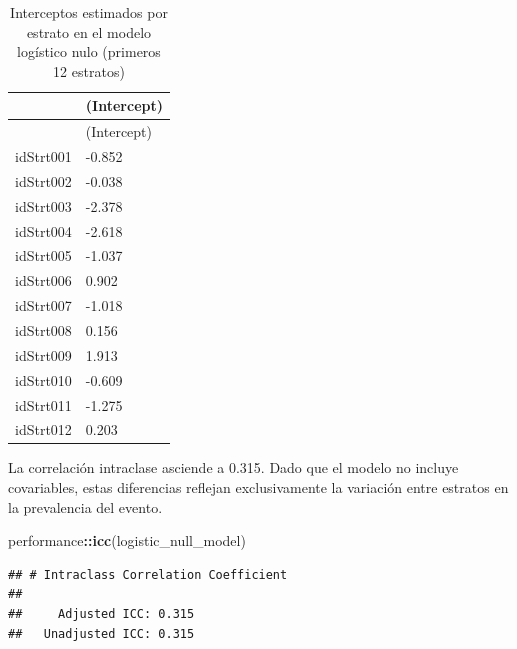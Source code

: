 \documentclass[
  spanish,
  12pt,
]{book}
\newenvironment{Shaded}{\begin{snugshade}}{\end{snugshade}}
\newcommand{\DataTypeTok}[1]{\textcolor[rgb]{0.13,0.29,0.53}{#1}}
\newcommand{\DecValTok}[1]{\textcolor[rgb]{0.00,0.00,0.81}{#1}}
\newcommand{\FunctionTok}[1]{\textcolor[rgb]{0.13,0.29,0.53}{\textbf{#1}}}
\newcommand{\NormalTok}[1]{#1}
\newcommand{\SpecialCharTok}[1]{\textcolor[rgb]{0.81,0.36,0.00}{\textbf{#1}}}
\begin{document}
\begin{Shaded}
\end{Shaded}

\begin{longtable}[]{@{}ll@{}}
\caption{\label{tab:tab-coef-logit-nulo}Interceptos estimados por estrato en el modelo logístico nulo (primeros 12 estratos)}\tabularnewline
\toprule\noalign{}
& (Intercept) \\
\midrule\noalign{}
\endfirsthead
\toprule\noalign{}
& (Intercept) \\
\midrule\noalign{}
\endhead
\bottomrule\noalign{}
\endlastfoot
idStrt001 & -0.852 \\
idStrt002 & -0.038 \\
idStrt003 & -2.378 \\
idStrt004 & -2.618 \\
idStrt005 & -1.037 \\
idStrt006 & 0.902 \\
idStrt007 & -1.018 \\
idStrt008 & 0.156 \\
idStrt009 & 1.913 \\
idStrt010 & -0.609 \\
idStrt011 & -1.275 \\
idStrt012 & 0.203 \\
\end{longtable}

La correlación intraclase asciende a 0.315. Dado que el modelo no incluye covariables, estas diferencias reflejan exclusivamente la variación entre estratos en la prevalencia del evento.

\begin{Shaded}
\begin{Highlighting}[]
\NormalTok{performance}\SpecialCharTok{::}\FunctionTok{icc}\NormalTok{(logistic\_null\_model)}
\end{Highlighting}
\end{Shaded}

\begin{verbatim}
## # Intraclass Correlation Coefficient
## 
##     Adjusted ICC: 0.315
##   Unadjusted ICC: 0.315
\end{verbatim}
\end{document}
